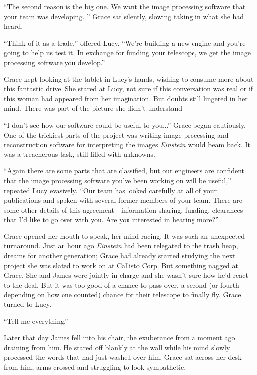 \documentclass[openany, 12pt]{book} %
\begin{document}
 ``The second reason is the big one. We want the image processing software that your team was developing. '' Grace sat silently, slowing taking in what she had heard.

``Think of it as a trade,'' offered Lucy. ``We're building a new engine and you're going to help us test it. In exchange for funding your telescope, we get the image processing software you develop.''

Grace kept looking at the tablet in Lucy's hands, wishing to consume more about this fantastic drive. She stared at Lucy, not sure if this conversation was real or if this woman had appeared from her imagination. But doubts still lingered in her mind. There was part of the picture she didn't understand

``I don't see how our software could be useful to you...'' Grace began cautiously. One of the trickiest parts of the project was writing image processing and reconstruction software for interpreting the images \textit{Einstein} would beam back. It was a treacherous task, still filled with unknowns.

``Again there are some parts that are classified, but our engineers are confident that the image processing software you've been working on will be useful,'' repeated Lucy evasively. ``Our team has looked carefully at all of your publications and spoken with several former members of your team. There are some other details of this agreement - information sharing, funding, clearances - that I'd like to go over with you. Are you interested in hearing more?''

Grace opened her mouth to speak, her mind racing. It was such an unexpected turnaround. Just an hour ago \textit{Einstein} had been relegated to the trash heap, dreams for another generation; Grace had already started studying the next project she was slated to work on at Callisto Corp. But something nagged at Grace. She and James were jointly in charge and she wasn't sure how he'd react to the deal. But it was too good of a chance to pass over, a second (or fourth depending on how one counted) chance for their telescope to finally fly. Grace turned to Lucy.

``Tell me everything.''

Later that day James fell into his chair, the exuberance from a moment ago draining from him. He stared off blankly at the wall while his mind slowly processed the words that had just washed over him. Grace sat across her desk from him, arms crossed and struggling to look sympathetic.
\end{document}

